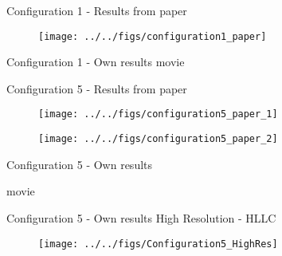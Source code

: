 
\begin{frame}{Configuration 1 - Results from paper}	
\begin{figure}
\centering
\texttt{[image: ../../figs/configuration1\_paper]}
\label{fig:configuration1_paper}
\end{figure}
\end{frame}

\begin{frame}{Configuration 1 - Own results}
	movie
\end{frame}

\begin{frame}{Configuration 5 - Results from paper}	
	
\begin{figure}
\centering
\texttt{[image: ../../figs/configuration5\_paper\_1]}
\label{fig:configuration5_paper_1}
\end{figure}

\begin{figure}
\centering
\texttt{[image: ../../figs/configuration5\_paper\_2]}
\label{fig:configuration5_paper_2}
\end{figure}

\end{frame}

\begin{frame}{Configuration 5 - Own results}
	
movie
	
	
\end{frame}

\begin{frame}{Configuration 5 - Own results}
	High Resolution - HLLC
	
\begin{figure}
\centering
\texttt{[image: ../../figs/Configuration5\_HighRes]}
\label{fig:Configuration5_HighRes}
\end{figure}

\end{frame}
	